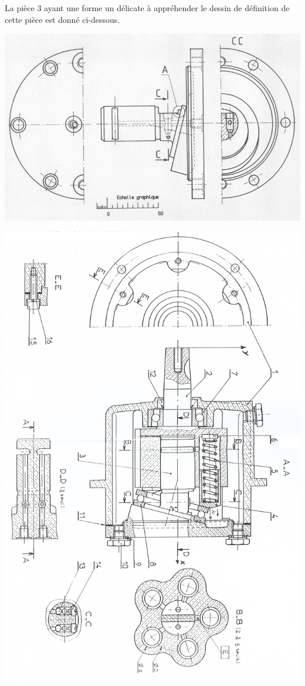 \begin{multicols}{2}
\begin{multicols}{2}
La pièce 3 ayant une forme un délicate à appréhender le dessin de définition de cette pièce est donné ci-dessous.

\begin{center}
\includegraphics[width=\linewidth]{images/fig_03}
\end{center}





\ifprof
\end{multicols}
\else
\end{multicols}
\fi



\begin{center}
\includegraphics[width=\linewidth]{images/fig_04}
\end{center}